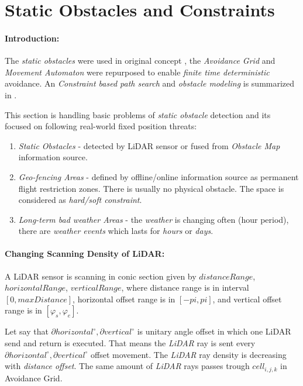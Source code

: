 \cleardoublepage
\section{Static Obstacles and Constraints}\label{s:staticObstacles}
    
\paragraph{Introduction:} The \emph{static obstacles} were used in original concept \cite{gomola2017probabilistic}, the \emph{Avoidance Grid} and \emph{Movement Automaton} were repurposed to enable \emph{finite time deterministic} avoidance. An \emph{Constraint based path search} and \emph{obstacle modeling} is summarized in \cite{hentenryck2009constraint}.

This section is handling basic problems of \emph{static obstacle} detection and its focused on following real-world fixed position threats:
\begin{enumerate}
    \item \emph{Static Obstacles} - detected by LiDAR sensor or fused from \emph{Obstacle Map} information source.
    
    \item \emph{Geo-fencing Areas} - defined by offline/online information source as permanent flight restriction zones. There is usually no physical obstacle. The space is considered as \emph{hard/soft constraint}.
    
    \item \emph{Long-term bad weather Areas} - the \emph{weather} is changing often (hour period), there are \emph{weather events}  which lasts for \emph{hours} or \emph{days}.
\end{enumerate}


\paragraph{Changing Scanning Density of LiDAR:} A LiDAR sensor is scanning in conic section given by $distance Range$, $horizontal Range$, $vertical Range$, where distance range is in interval $[0,maxDistance]$, horizontal offset range is in $[-pi,pi]$, and vertical offset range is in $[\varphi_s, \varphi_e]$.  

Let say that $\partial horizontal^\circ, \partial vertical^\circ$ is unitary angle offset in which one LiDAR send and return is executed. That means the \emph{LiDAR} ray is sent every $\partial horizontal^\circ, \partial vertical^\circ$ offset movement. The \emph{LiDAR} ray density is decreasing with \emph{distance offset}. The same amount of \emph{LiDAR} rays passes trough $cell_{i,j,k}$ in Avoidance Grid.

